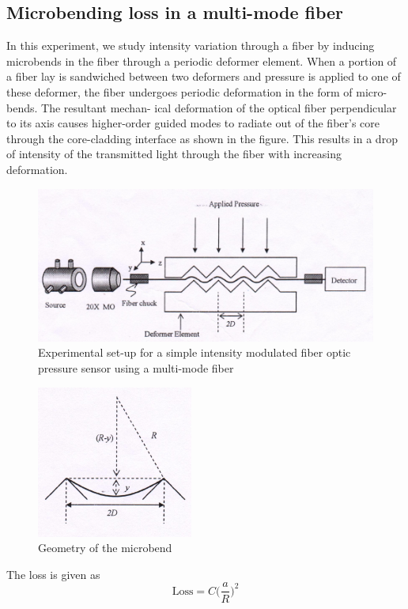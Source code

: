 \documentclass[%
 reprint,
nofootinbib,
 amsmath,amssymb,
 aps,
]{revtex4-2}
\begin{document}
\subsection{Microbending loss in a multi-mode fiber}
In this experiment, we study intensity variation through a
fiber by inducing microbends in the fiber through a periodic
deformer element. When a portion of a fiber lay is sandwiched between two deformers and pressure is applied to
one of these deformer, the fiber undergoes periodic deformation in the form of micro-bends. The resultant mechan-
ical deformation of the optical fiber perpendicular to its
axis causes higher-order guided modes to radiate out of the
fiber’s core through the core-cladding interface as shown in
the figure. This results in a drop of intensity of the transmitted light through the fiber with increasing deformation.
\begin{figure}
	\centering
	\includegraphics[scale = 0.6]{mbschematic}
	\caption{Experimental set-up for a simple intensity modulated fiber optic pressure
		sensor using a multi-mode fiber}
	\label{fig:mbschematic}
\end{figure}
\begin{figure}
	\centering
	\includegraphics[scale = 0.7]{geometry}
	\caption{Geometry of the microbend}
	\label{fig:geometry}
\end{figure}
The loss is given as
\begin{equation}\label{key}
	\textrm{Loss} = C \Big(\dfrac{a}{R}\Big)^2
\end{equation}
\end{document}
